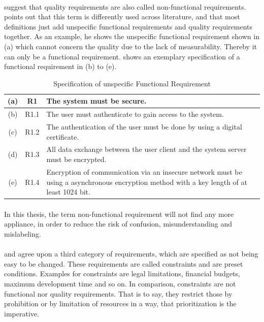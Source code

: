 \paragraph{} \textcite[cf.][15]{Lauesen.2008} suggest that quality requirements are also called non-functional requirements. \textcite[cf.][16-17]{Pohl.2007} points out that this term is differently used across literature, and that most definitions just add unspecific functional requirements and quality requirements together. As an example, he shows the unspecific functional requirement shown in  (a) which cannot concern the quality due to the lack of measurability. Thereby it can only be a functional requirement. \textcite[17]{Pohl.2007} shows an exemplary specification of a  functional requirement in  (b) to (e).

\begin{table}[H]
    \centering
    \begin{tabular}{|c|c|m{10cm}|}
        \hline
        (a) & R1 & The system  must be secure.\\
         \hline
        \hline
        (b) & R1.1 & The user must authenticate to gain access to the system.\\
        \hline
        (c) & R1.2 & The authentication of the user must be done by using a digital certificate.\\
        \hline
        (d) & R1.3 & All data exchange between the user client and the system server must be encrypted.\\
        \hline
        (e) & R1.4 & Encryption of communication via an insecure network must be using a asynchronous encryption method with a key length of at least 1024 bit.\\
        \hline
    \end{tabular}
    \caption[Specification of unspecific Functional Requirement]{Specification of unspecific Functional Requirement \parencite[17]{Pohl.2007}}
    \label{tab:reqSpec}
\end{table}

\paragraph{} In this thesis, the term non-functional requirement will not find any more appliance, in order to reduce the risk of confusion, misunderstanding and mislabeling.
\paragraph{} \textcite[29]{Ebert.2014} and \textcite[18-19]{Pohl.2007} agree upon a third category of requirements, which are specified as not being easy to be changed. These requirements are called constraints and are preset conditions. Examples for constraints are legal limitations, financial budgets, maximum development time and so on. In comparison, constraints are not functional nor quality requirements. That is to say, they restrict those by prohibition or by limitation of resources in a way, that prioritization is the imperative.
